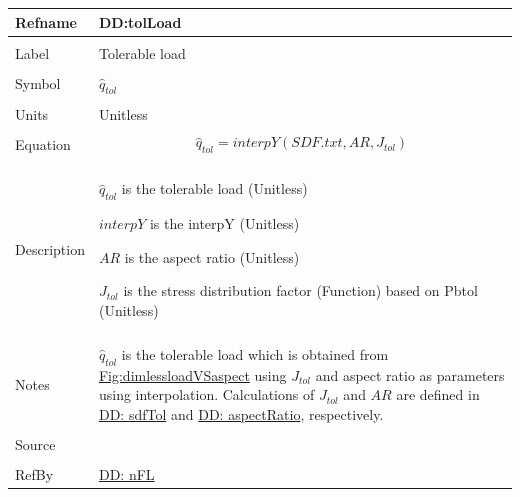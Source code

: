 \documentclass[12pt]{article}
\begin{document}
\noindent \begin{minipage}{\textwidth}
\begin{tabular}{p{} p{}}
\toprule \textbf{Refname} & \textbf{DD:tolLoad}
\label{DD:tolLoad}
\\ \midrule \\
Label & Tolerable load
\\ \midrule \\
Symbol & ${\hat{q}_{tol}}$
\\ \midrule \\
Units & Unitless
\\ \midrule \\
Equation & \begin{displaymath}
           {\hat{q}_{tol}}=interpY\left(SDF.txt,AR,{J_{tol}}\right)
           \end{displaymath}
\\ \midrule \\
Description & \begin{symbDescription}
              \item{${\hat{q}_{tol}}$ is the tolerable load (Unitless)}
              \item{$interpY$ is the interpY (Unitless)}
              \item{$AR$ is the aspect ratio (Unitless)}
              \item{${J_{tol}}$ is the stress distribution factor (Function) based on Pbtol (Unitless)}
              \end{symbDescription}
\\ \midrule \\
Notes & ${\hat{q}_{tol}}$ is the tolerable load which is obtained from \hyperref[Figure:dimlessloadVSaspect]{Fig:dimlessloadVSaspect} using ${J_{tol}}$ and aspect ratio as parameters using interpolation. Calculations of ${J_{tol}}$ and $AR$ are defined in \hyperref[DD:sdfTol]{DD: sdfTol} and \hyperref[DD:aspectRatio]{DD: aspectRatio}, respectively.
\\ \midrule \\
Source & \cite{astm2009}
\\ \midrule \\
RefBy & \hyperref[DD:nFL]{DD: nFL}
\\ \bottomrule \end{tabular}
\end{minipage}
\par~
\end{document}
